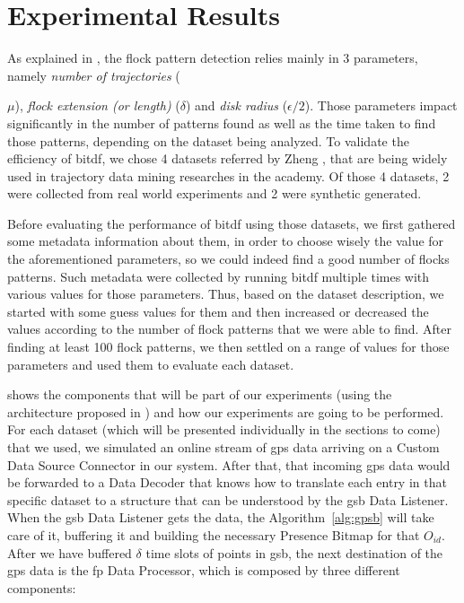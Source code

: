 \chapter{Experimental Results}
\label{chp:results}
As explained in , the flock pattern detection relies mainly in 3 parameters, namely
\textit{number of trajectories} ({$\mu$), \textit{flock extension (or length)} ($\delta$) and \textit{disk radius}
($\epsilon/2$). Those parameters impact significantly in the number of patterns found as well as the time taken to find
those patterns, depending on the dataset being analyzed. To validate the efficiency of \ac{bitdf}, we chose 4 datasets
referred by Zheng \citep{survey}, that are being widely used in trajectory data mining researches in the academy. Of
those 4 datasets, 2 were collected from real world experiments and 2 were synthetic generated.

Before evaluating the performance of \ac{bitdf} using those datasets, we first gathered some metadata information about
them, in order to choose wisely the value for the aforementioned parameters, so we could indeed find a good number of
flocks patterns. Such metadata were collected by running \ac{bitdf} multiple times with various values for those
parameters. Thus, based on the dataset description, we started with some guess values for them and then increased or
decreased the values according to the number of flock patterns that we were able to find. After finding at least 100
flock patterns, we then settled on a range of values for those parameters and used them to evaluate each dataset.

 shows the components that will be part of our experiments (using the architecture
proposed in ) and how our experiments are going to be performed. For each dataset (which will
be presented individually in the sections to come) that we used, we simulated an online stream of \ac{gps} data arriving
on a Custom Data Source Connector in our system. After that, that incoming \ac{gps} data would be forwarded to a Data
Decoder that knows how to translate each entry in that specific dataset to a structure that can be understood by the
\ac{gsb} Data Listener. When the \ac{gsb} Data Listener gets the data, the Algorithm~\ref{alg:gpsb} will take care of
it, buffering it and building the necessary Presence Bitmap for that $O_{id}$. After we have buffered $\delta$ time
slots of points in \ac{gsb}, the next destination of the \ac{gps} data is the \ac{fp} Data Processor, which is composed
by three different components:

}
